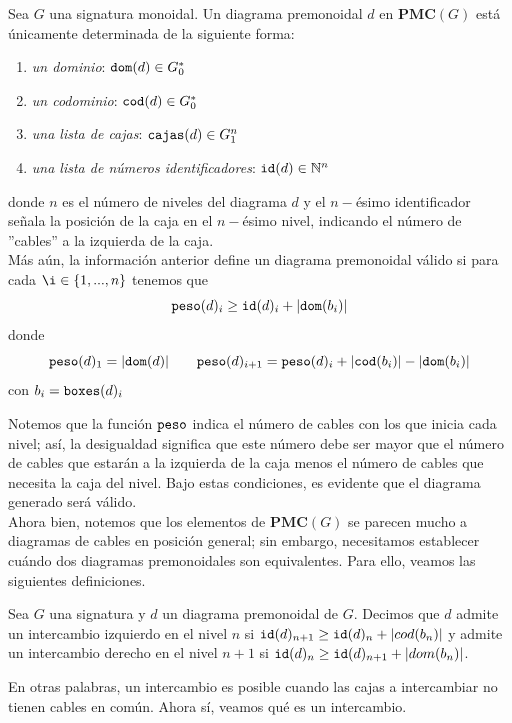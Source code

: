 \documentclass[../main.tex]{subfiles}
\begin{document}
\begin{prop}
\label{decode}
	Sea $G$ una signatura monoidal. Un diagrama premonoidal $d$ en $\textbf{PMC}(G)$ está únicamente determinada de la siguiente forma:
	\begin{enumerate}
		\item \textit{un dominio}: ${\tt{dom}}(d) \in G_0^*$
		\item \textit{un codominio}: ${\tt{cod}}(d) \in G_0^*$
		\item \textit{una lista de cajas}: ${\tt{cajas}}(d) \in G_1^n$
		\item \textit{una lista de números identificadores}: ${\tt{id}}(d) \in \mathbb{N}^n$
	\end{enumerate}
	donde $n$ es el número de niveles del diagrama $d$ y el $n-$ésimo identificador señala la posición de la caja en el $n-$ésimo nivel, indicando el número de ''cables'' a la izquierda de la caja. \\
	Más aún, la información anterior define un diagrama premonoidal válido si para cada $\i \in \{ 1, ..., n\}$ tenemos que
	$${\tt{peso}}(d)_i \geq {\tt{id}}(d)_i + |{\tt{dom}}(b_i)|$$
	donde
	\begin{equation*}
		{\tt{peso}}(d)_1 = 	|{\tt{dom}}(d)| \quad \quad  {\tt{peso}}(d)_{i+1}= {\tt{peso}}(d)_i + |{\tt{cod}}(b_i)| - |{\tt{dom}}(b_i)| 
	\end{equation*}
	con $b_i={\tt{boxes}}(d)_i$
\end{prop}
Notemos que la función $\tt{peso}$ indica el número de cables con los que inicia cada nivel; así, la desigualdad significa que este número debe ser mayor que el número de cables que estarán a la izquierda de la caja menos el número de cables que necesita la caja del nivel. Bajo estas condiciones, es evidente que el diagrama generado será válido.  \\
Ahora bien, notemos que los elementos de $\textbf{PMC}(G)$ se parecen mucho a diagramas de cables en posición general; sin embargo, necesitamos establecer cuándo dos diagramas premonoidales son equivalentes. Para ello, veamos las siguientes definiciones.
\begin{dfn}
	Sea $G$ una signatura y $d$ un diagrama premonoidal de $G$. Decimos que $d$ admite un intercambio izquierdo en el nivel $n$ si ${\tt{id}}(d)_{n+1} \geq {\tt{id}}(d)_{n} + |cod(b_n)|$ y admite un intercambio derecho en el nivel $n+1$ si ${\tt{id}}(d)_{n} \geq {\tt{id}}(d)_{n+1} + |dom(b_n)|$.
\end{dfn}
En otras palabras, un intercambio es posible cuando las cajas a intercambiar no tienen cables en común. Ahora sí, veamos qué es un intercambio.
\end{document}
